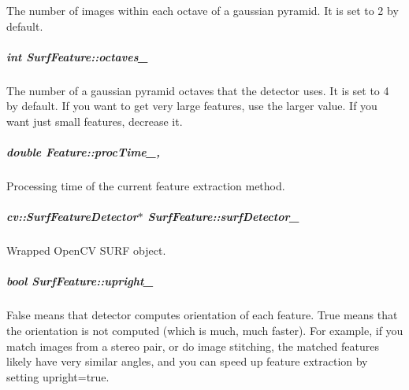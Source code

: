 The number of images within each octave of a gaussian pyramid. It is set to 2 by default. 

\hypertarget{group___feature_extractor_a87f1c0c6c1c749b0736633da668c977b}{
\subparagraph[{octaves\-\_\-}]{\setlength{\rightskip}{0pt plus 5cm}int Surf\-Feature\-::octaves\-\_\-\hspace{0.3cm}{\ttfamily [private]}}}\label{group___feature_extractor_a87f1c0c6c1c749b0736633da668c977b}


The number of a gaussian pyramid octaves that the detector uses. It is set to 4 by default. If you want to get very large features, use the larger value. If you want just small features, decrease it. 

\hypertarget{group___feature_extractor_a1b176bd48aad30b553e0f87f0264c3d0}{
\subparagraph[{proc\-Time\-\_\-}]{\setlength{\rightskip}{0pt plus 5cm}double Feature\-::proc\-Time\-\_\-\hspace{0.3cm}{\ttfamily [protected]}, {\ttfamily [inherited]}}}\label{group___feature_extractor_a1b176bd48aad30b553e0f87f0264c3d0}


Processing time of the current feature extraction method. 

\hypertarget{group___feature_extractor_a191dd9737bd6dc754e43912bb3aad219}{
\subparagraph[{surf\-Detector\-\_\-}]{\setlength{\rightskip}{0pt plus 5cm}cv\-::\-Surf\-Feature\-Detector$\ast$ Surf\-Feature\-::surf\-Detector\-\_\-\hspace{0.3cm}{\ttfamily [private]}}}\label{group___feature_extractor_a191dd9737bd6dc754e43912bb3aad219}


Wrapped Open\-C\-V S\-U\-R\-F object. 

\hypertarget{group___feature_extractor_a4900461472b4f6707ce0db3bde65bda2}{
\subparagraph[{upright\-\_\-}]{\setlength{\rightskip}{0pt plus 5cm}bool Surf\-Feature\-::upright\-\_\-\hspace{0.3cm}{\ttfamily [private]}}}\label{group___feature_extractor_a4900461472b4f6707ce0db3bde65bda2}


False means that detector computes orientation of each feature. True means that the orientation is not computed (which is much, much faster). For example, if you match images from a stereo pair, or do image stitching, the matched features likely have very similar angles, and you can speed up feature extraction by setting upright=true. 

